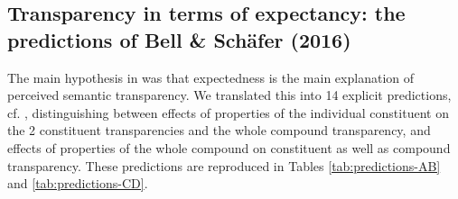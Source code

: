 \subsection[Predicting semantic transparency]{Transparency in terms of expectancy: the predictions of
  Bell \& Schäfer (2016)}
\label{sec:bellschaefer2016_predictions}

The main hypothesis in \citet{BellandSchaefer:2016} was that
expectedness is the main explanation of perceived semantic
transparency. We translated this into 14 explicit predictions, cf. \citet[172--174]{BellandSchaefer:2016},
distinguishing between effects of properties of the individual
constituent on the 2 constituent transparencies and the whole compound
transparency, and effects of properties of the whole compound on
constituent as well as compound transparency. These predictions are 
 reproduced in Tables \ref{tab:predictions-AB} and \ref{tab:predictions-CD}.

